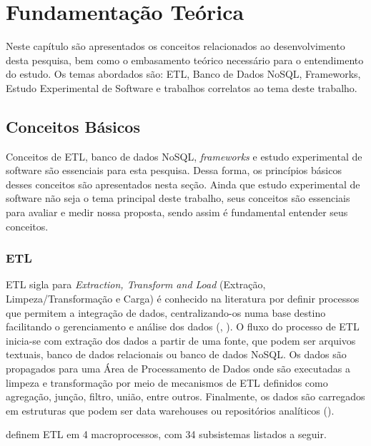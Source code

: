 \chapter{Fundamentação Teórica}

Neste capítulo são apresentados os conceitos relacionados ao desenvolvimento desta pesquisa, bem como o embasamento teórico necessário para o entendimento do estudo. Os temas abordados são: ETL, Banco de Dados NoSQL, Frameworks, Estudo Experimental de Software e trabalhos correlatos ao tema deste trabalho.


\clearpage

\section{Conceitos Básicos}

Conceitos de ETL, banco de dados NoSQL, \textit{frameworks} e estudo experimental de software são essenciais para esta pesquisa. Dessa forma, os princípios básicos desses conceitos são apresentados nesta seção. Ainda que estudo experimental de software não seja o tema principal deste trabalho, seus conceitos são essenciais para avaliar e medir nossa proposta, sendo assim é fundamental entender seus conceitos.

\subsection{ETL}

ETL sigla para \textit{Extraction, Transform and Load} (Extração, Limpeza/Transformação e Carga) é conhecido na literatura por definir processos que permitem a integração de dados, centralizando-os numa base destino facilitando o gerenciamento e análise dos dados (\cite{kimball:2004}, \cite{rud:2009}). O fluxo do processo de ETL inicia-se com extração dos dados a partir de uma fonte, que podem ser arquivos textuais, banco de dados relacionais ou banco de dados NoSQL. Os dados são propagados para uma Área de Processamento de Dados onde são executadas a limpeza e transformação por meio de mecanismos de ETL definidos como agregação, junção, filtro, união, entre outros. Finalmente, os dados são carregados em estruturas que podem ser data warehouses ou repositórios analíticos (\cite{silva:2016}). 

\cite{kimball:2004} definem ETL em 4 macroprocessos, com 34 subsistemas listados a seguir. 

